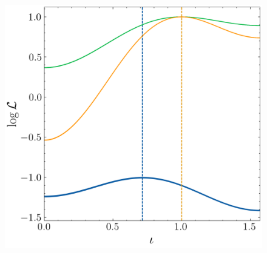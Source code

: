 \documentclass[fleqn,usenatbib,useAMS]{mnras}
\begin{document}
\begin{figure}
	\centering
	\includegraphics[width=\columnwidth]{images/likelihood_iota_new}

\end{figure}
\end{document}
